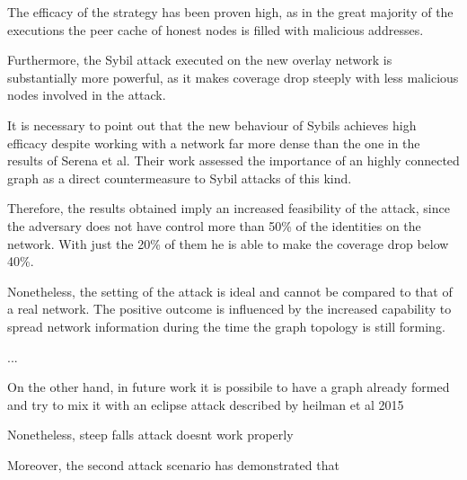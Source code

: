 \documentclass[12pt, letterpaper, twoside]{article}
\begin{document}
The efficacy of the strategy has been proven high, as in the great majority of the executions the peer cache of honest nodes is filled with malicious addresses.

Furthermore, the Sybil attack executed on the new overlay network is substantially more powerful, as it makes coverage drop steeply with less malicious nodes involved in the attack.

It is necessary to point out that the new behaviour of Sybils achieves high efficacy despite working with a network far more dense than the one in the results of Serena et al. Their work assessed the importance of an highly connected graph as a direct countermeasure to Sybil attacks of this kind.

Therefore, the results obtained imply an increased feasibility of the attack, since the adversary does not have control more than 50\% of the identities on the network. With just the 20\% of them he is able to make the coverage drop below 40\%.

Nonetheless, the setting of the attack is ideal and cannot be compared to that of a real network. The positive outcome is influenced by the increased capability to spread network information during the time the graph topology is still forming.

...

On the other hand, in future work it is possibile to have a graph already formed and try to mix it with an eclipse attack described by heilman et al 2015

Nonetheless, steep falls attack doesnt work properly

Moreover, the second attack scenario has demonstrated that













\end{document}
